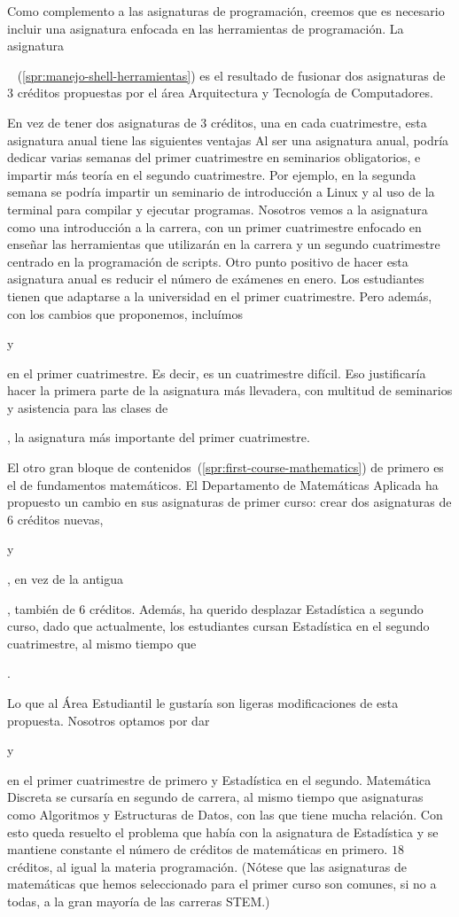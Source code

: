 Como complemento a las asignaturas de programación,
creemos que es necesario incluir
una asignatura enfocada en las herramientas de programación.
La asignatura \subject{Manejo de Shell y Herramientas Básicas de Programación}~%
(\cref{spr:manejo-shell-herramientas})
es el resultado de fusionar dos asignaturas de $3$ créditos propuestas por
el área Arquitectura y Tecnología de Computadores.

En vez de tener dos asignaturas de $3$ créditos,
una en cada cuatrimestre,
esta asignatura anual tiene las siguientes ventajas
Al ser una asignatura anual,
podría dedicar varias semanas del primer cuatrimestre
en seminarios obligatorios,
e impartir más teoría en el segundo cuatrimestre.
Por ejemplo, en la segunda semana se podría impartir un seminario de
introducción a Linux y al uso de la terminal para compilar y ejecutar programas.
Nosotros vemos a la asignatura como una introducción a la carrera,
con un primer cuatrimestre enfocado en
enseñar las herramientas que utilizarán en la carrera
y un segundo cuatrimestre centrado en la programación de scripts.
Otro punto positivo de hacer esta asignatura anual es
reducir el número de exámenes en enero.
Los estudiantes tienen que adaptarse a la universidad en el primer cuatrimestre.
Pero además, con los cambios que proponemos,
incluímos \subject{Álgebra Lineal} y \subject{Cálculo} en el primer cuatrimestre.
Es decir, es un cuatrimestre difícil.
Eso justificaría hacer la primera parte de la asignatura más llevadera,
con multitud de seminarios y asistencia para las clases de
\subject{Programación I}, la asignatura más importante del primer cuatrimestre.

El otro gran bloque de contenidos~(\cref{spr:first-course-mathematics})
de primero es el de fundamentos matemáticos.
El Departamento de Matemáticas Aplicada
ha propuesto un cambio en sus asignaturas de primer curso:
crear dos asignaturas de $6$ créditos nuevas,
\subject{Álgebra Lineal} y \subject{Matemática Discreta},
en vez de la antigua \subject{Álgebra y Matemática Discreta},
también de $6$ créditos.
Además, ha querido desplazar Estadística a segundo curso,
dado que actualmente,
los estudiantes cursan Estadística en el segundo cuatrimestre,
al mismo tiempo que \subject{Cálculo}.

Lo que al Área Estudiantil le gustaría son
ligeras modificaciones de esta propuesta.
Nosotros optamos por dar \subject{Álgebra Lineal} y \subject{Cálculo}
en el primer cuatrimestre de primero y
Estadística en el segundo.
Matemática Discreta se cursaría en segundo de carrera,
al mismo tiempo que asignaturas como Algoritmos y Estructuras de Datos,
con las que tiene mucha relación.
Con esto queda resuelto el problema que había con la asignatura de Estadística y
se mantiene constante el número de créditos de matemáticas en primero.
$18$ créditos, al igual la materia programación.
(Nótese que las asignaturas de matemáticas que
hemos seleccionado para el primer curso
son comunes, si no a todas, a la gran mayoría de las carreras STEM.)

